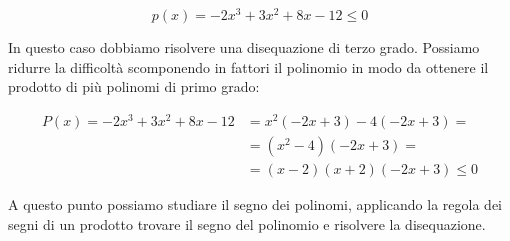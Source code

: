 \begin{exrig}
\begin{esempio}
 \[p(x)=-2x^3+3x^2+8x-12 \le 0\]

In questo caso dobbiamo risolvere una disequazione di terzo grado. 
Possiamo ridurre la difficoltà scomponendo in fattori il polinomio in modo da 
ottenere il prodotto di più polinomi di primo grado: 

\begin{align*}
P(x) = -2x^3+3x^2+8x-12 &= x^2(-2x+3)-4(-2x+3) = \\
                        &= (x^2-4)(-2x+3) = \\
                        &= (x-2)(x+2)(-2x+3) \le 0
\end{align*}

\begin{minipage}{.65\textwidth}

A questo punto possiamo studiare il segno dei polinomi, applicando la regola 
dei segni di un prodotto trovare il segno del polinomio e risolvere la 
disequazione.

\end{minipage}
\begin{minipage}{.30\textwidth}

\begin{inaccessibleblock}
\begin{center}
  
\end{center}
\end{inaccessibleblock}
\end{minipage}


\end{esempio}
\end{exrig}
